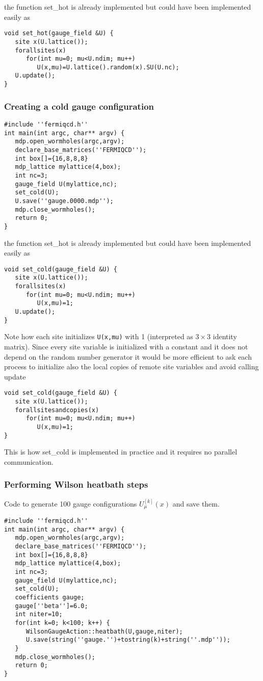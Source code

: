 the function set\_hot is already implemented but could have been implemented
easily as
\begin{verbatim}
void set_hot(gauge_field &U) {
   site x(U.lattice());
   forallsites(x)
      for(int mu=0; mu<U.ndim; mu++)
         U(x,mu)=U.lattice().random(x).SU(U.nc);
   U.update();
}
\end{verbatim}

\subsubsection{Creating a cold gauge configuration}
\begin{verbatim}
#include ''fermiqcd.h''
int main(int argc, char** argv) {
   mdp.open_wormholes(argc,argv);
   declare_base_matrices(''FERMIQCD'');
   int box[]={16,8,8,8}
   mdp_lattice mylattice(4,box);
   int nc=3;
   gauge_field U(mylattice,nc);
   set_cold(U);
   U.save(''gauge.0000.mdp'');
   mdp.close_wormholes();
   return 0;
}
\end{verbatim}

the function set\_hot is already implemented but could have been implemented
easily as
\begin{verbatim}
void set_cold(gauge_field &U) {
   site x(U.lattice());
   forallsites(x)
      for(int mu=0; mu<U.ndim; mu++)
         U(x,mu)=1;
   U.update();
}
\end{verbatim}

Note how each site initializes {\tt U(x,mu)} with 1 (interpreted as $3\times
3$ identity matrix). Since every site variable is initialized with a
constant and it does not depend on the random number generator it would be
more efficient to ask each process to initialize also the local copies of
remote site variables and avoid calling update
\begin{verbatim}
void set_cold(gauge_field &U) {
   site x(U.lattice());
   forallsitesandcopies(x)
      for(int mu=0; mu<U.ndim; mu++)
         U(x,mu)=1;
}
\end{verbatim}

This is how set\_cold is implemented in practice and it requires no parallel
communication.

\subsubsection{Performing Wilson heatbath steps}

Code to generate 100 gauge configurations $U_\mu ^{[k]}(x)$ and save them.
\begin{verbatim}
#include ''fermiqcd.h''
int main(int argc, char** argv) {
   mdp.open_wormholes(argc,argv);
   declare_base_matrices(''FERMIQCD'');
   int box[]={16,8,8,8}
   mdp_lattice mylattice(4,box);
   int nc=3;
   gauge_field U(mylattice,nc);
   set_cold(U);
   coefficients gauge;
   gauge[''beta'']=6.0;
   int niter=10;
   for(int k=0; k<100; k++) {
      WilsonGaugeAction::heatbath(U,gauge,niter);
      U.save(string(''gauge.'')+tostring(k)+string(''.mdp''));
   }
   mdp.close_wormholes();
   return 0;
}
\end{verbatim}

